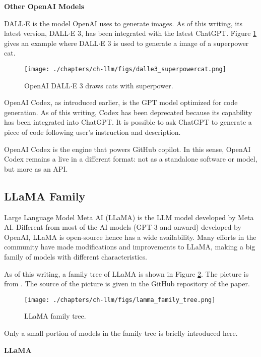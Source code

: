 \vspace{0.1in}
\noindent \textbf{Other OpenAI Models}
\vspace{0.1in}

DALL$\cdot$E is the model OpenAI uses to generate images. As of this writing, its latest version, DALL$\cdot$E 3, has been integrated with the latest ChatGPT. Figure \ref{fig:superpowercat} gives an example where DALL$\cdot$E 3 is used to generate a image of a superpower cat.
\begin{figure}[tbp]
	\centering
	\texttt{[image: ./chapters/ch-llm/figs/dalle3\_superpowercat.png]}
	\caption{OpenAI DALL$\cdot$E 3 draws cats with superpower.}
	\label{fig:superpowercat}
\end{figure}

OpenAI Codex, as introduced earlier, is the GPT model optimized for code generation. As of this writing, Codex has been deprecated because its capability has been integrated into ChatGPT. It is possible to ask ChatGPT to generate a piece of code following user's instruction and description.

OpenAI Codex is the engine that powers GitHub copilot. In this sense, OpenAI Codex remains a live in a different format: not as a standalone software or model, but more as an API.

\subsection{LLaMA Family}

Large Language Model Meta AI (LLaMA) is the LLM model developed by Meta AI. Different from most of the AI models (GPT-3 and onward) developed by OpenAI, LLaMA is open-source hence has a wide availability. Many efforts in the community have made modifications and improvements to LLaMA, making a big family of models with different characteristics.

As of this writing, a family tree of LLaMA is shown in Figure \ref{fig:llama_family_tree}. The picture is from \cite{zhao2023survey}. The source of the picture is given in the GitHub repository of the paper.
\begin{figure}[tbp]
	\centering
	\texttt{[image: ./chapters/ch-llm/figs/lamma\_family\_tree.png]}
	\caption{LLaMA family tree.}
	\label{fig:llama_family_tree}
\end{figure}
Only a small portion of models in the family tree is briefly introduced here.

\vspace{0.1in}
\noindent \textbf{LLaMA}
\vspace{0.1in}

